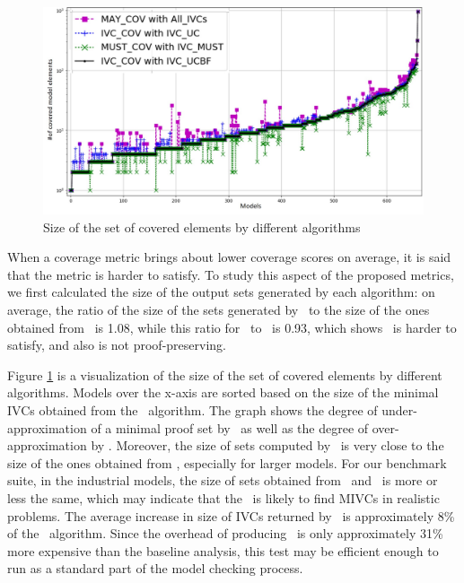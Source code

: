 \begin{figure}
  \centering
  \includegraphics[width=\columnwidth]{figs/cv_size.jpg}
  \caption{Size of the set of covered elements by different algorithms}\label{fig:cvsize}
\end{figure}

When a coverage metric brings about lower coverage scores on average,
it is said that the metric is harder to satisfy.
To study this aspect of the proposed metrics,
we first calculated the size of the output sets generated by each algorithm: on average, the ratio of the size of the sets generated by \ucalg\ to the size of the ones obtained from \ucbfalg\ is 1.08,
while this ratio for \mustalg\ to \ucbfalg\ is 0.93, which shows \mustalg\ is harder to satisfy, and also is not proof-preserving.

Figure \ref{fig:cvsize} is a visualization of the size of the set of covered elements by different algorithms. Models over the x-axis are sorted based on the size of the minimal IVCs obtained from the \ucbfalg\
algorithm.
The graph shows the degree of under-approximation of a minimal proof set by \mustalg\ as well as the degree of over-approximation by \ucalg.
Moreover, the size of sets computed by \ucalg\ is very close to the size
of the ones obtained from \ucbfalg, especially for larger models.  For our benchmark suite, in the industrial models, the size of sets obtained from \ucbfalg\ and \ucalg\ is more or less the same, which may indicate that the \ucalg\ is likely to find MIVCs in realistic problems.  The average increase in size of IVCs returned by \ucalg\ is approximately 8\% of the \ucbfalg\ algorithm.  Since the overhead of producing \ucalg\ is only approximately 31\% more expensive than the baseline analysis, this test may be efficient enough to run as a standard part of the model checking process.  %


